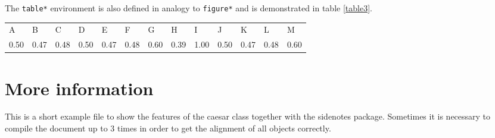\documentclass{shindig_book}
\begin{document}
The \texttt{table*} environment is also defined in analogy to \texttt{figure*} and is demonstrated in table \ref{table3}.
%
\begin{table*}[h!]
 \begin{tabular}{lllllllllllll}%
     A&B&C&D&E&F&G&H&I&J&K&L&M\\%
    0.50&0.47&0.48&0.50&0.47&0.48&0.60&0.39&1.00&0.50&0.47&0.48&0.60\\%
  \end{tabular}%
  \vspace{2pt}
  \caption{Even more numbers in a big table are shown here. This table spans across the full page, text width plus margin.\label{table3}}%
\end{table*}

%
\section{More information}
 This is a short example file to show the features of the caesar class together with the sidenotes package. Sometimes it is necessary to compile the document up to 3 times in order to get the alignment of all objects correctly.
%
\printbibliography[heading=bibintoc]
\end{document}
